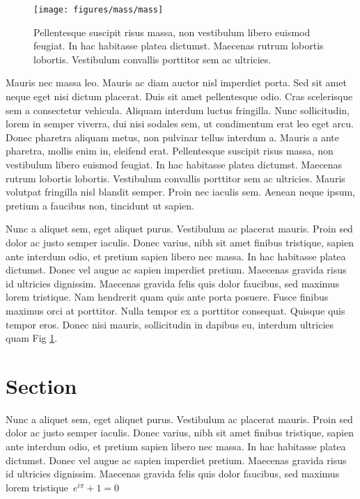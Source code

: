 \documentclass[10pt]{article}
\begin{document}
\par\null{}
\begin{figure}[h!]
\begin{center}
\texttt{[image: figures/mass/mass]}
\caption{{Pellentesque suscipit risus massa, non vestibulum libero euismod
feugiat. In hac habitasse platea dictumst. Maecenas rutrum lobortis
lobortis. Vestibulum convallis porttitor sem ac ultricies.
{\label{931769}}%
}}
\end{center}
\end{figure}

\par\null

Mauris nec massa leo. Mauris ac diam auctor nisl imperdiet porta. Sed
sit amet neque eget nisi dictum placerat. Duis sit amet pellentesque
odio. Cras scelerisque sem a consectetur vehicula. Aliquam interdum
luctus fringilla. Nunc sollicitudin, lorem in semper viverra, dui nisi
sodales sem, ut condimentum erat leo eget arcu. Donec pharetra aliquam
metus, non pulvinar tellus interdum a. Mauris a ante pharetra, mollis
enim in, eleifend erat. Pellentesque suscipit risus massa, non
vestibulum libero euismod feugiat. In hac habitasse platea dictumst.
Maecenas rutrum lobortis lobortis. Vestibulum convallis porttitor sem ac
ultricies. Mauris volutpat fringilla nisl blandit semper. Proin nec
iaculis sem. Aenean neque ipsum, pretium a faucibus non, tincidunt ut
sapien.

Nunc a aliquet sem, eget aliquet purus. Vestibulum ac placerat mauris.
Proin sed dolor ac justo semper iaculis. Donec varius, nibh sit amet
finibus tristique, sapien ante interdum odio, et pretium sapien libero
nec massa. In hac habitasse platea dictumst. Donec vel augue ac sapien
imperdiet pretium. Maecenas gravida risus id ultricies dignissim.
Maecenas gravida felis quis dolor faucibus, sed maximus lorem tristique.
Nam hendrerit quam quis ante porta posuere. Fusce finibus maximus orci
at porttitor. Nulla tempor ex a porttitor consequat. Quisque quis tempor
eros. Donec nisi mauris, sollicitudin in dapibus eu, interdum ultricies
quam Fig {\ref{931769}}.

\section*{Section}

{\label{507127}}

Nunc a aliquet sem, eget aliquet purus. Vestibulum ac placerat mauris.
Proin sed dolor ac justo semper iaculis. Donec varius, nibh sit amet
finibus tristique, sapien ante interdum odio, et pretium sapien libero
nec massa. In hac habitasse platea dictumst. Donec vel augue ac sapien
imperdiet pretium. Maecenas gravida risus id ultricies dignissim.
Maecenas gravida felis quis dolor faucibus, sed maximus lorem
tristique~\(e^{i\pi}+1=0\)
\end{document}
